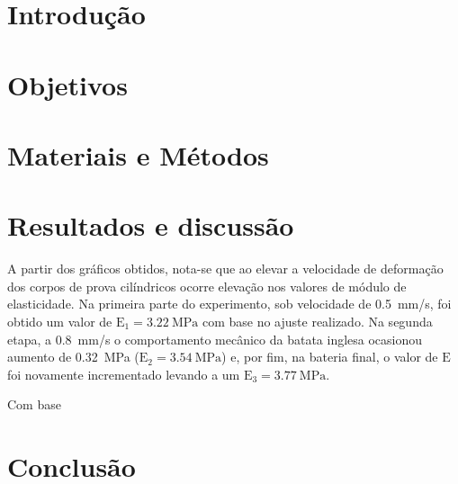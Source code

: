 \documentclass[a4paper, 12pt]{article}
\begin{document}
	\section{Introdução}
	

	
	\section{Objetivos}
	\section{Materiais e Métodos}
	\section{Resultados e discussão}
	
	A partir dos gráficos obtidos, nota-se que ao elevar a velocidade de deformação dos corpos de prova cilíndricos ocorre elevação nos valores de módulo de elasticidade. Na primeira parte do experimento, sob velocidade de \SI{.5}{\milli\meter/\second}, foi obtido um valor de $\textrm{E}_{1}=\SI{3.22}{\mega\pascal}$ com base no ajuste realizado. Na segunda etapa, a \SI{.8}{\milli\meter/\second} o comportamento mecânico da batata inglesa ocasionou aumento de \SI{.32}{\mega\pascal} ($\textrm{E}_{2}=\SI{3.54}{\mega\pascal}$) e, por fim, na bateria final, o valor de $\textrm{E}$ foi novamente incrementado levando a um $\textrm{E}_{3}=\SI{3.77}{\mega\pascal}$. 
	
	Com base
	
	\section{Conclusão}
\end{document}
